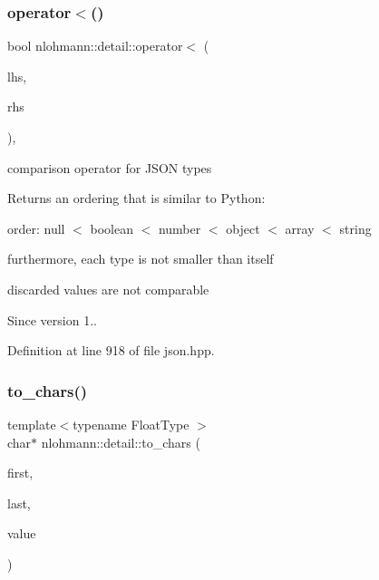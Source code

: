 \mbox{\label{namespacenlohmann_1_1detail_a09169efff3bd1771fff29bd92cea19e0}} 
\subsubsection{\texorpdfstring{operator$<$()}{operator<()}}
{\footnotesize\ttfamily bool nlohmann\+::detail\+::operator$<$ (\begin{DoxyParamCaption}\item[{const \hyperlink{namespacenlohmann_1_1detail_a1ed8fc6239da25abcaf681d30ace4985}{value\+\_\+t}}]{lhs,  }\item[{const \hyperlink{namespacenlohmann_1_1detail_a1ed8fc6239da25abcaf681d30ace4985}{value\+\_\+t}}]{rhs }\end{DoxyParamCaption})\hspace{0.3cm}{\ttfamily [inline]}, {\ttfamily [noexcept]}}



comparison operator for J\+S\+ON types 

Returns an ordering that is similar to Python\+:
\begin{DoxyItemize}
\item order\+: null $<$ boolean $<$ number $<$ object $<$ array $<$ string
\item furthermore, each type is not smaller than itself
\item discarded values are not comparable
\end{DoxyItemize}

\begin{DoxySince}{Since}
version 1.. 
\end{DoxySince}


Definition at line 918 of file json.\+hpp.

\mbox{\label{namespacenlohmann_1_1detail_a6192f1eab05fbbc5c35edb8368c8fc57}} 
\subsubsection{\texorpdfstring{to\+\_\+chars()}{to\_chars()}}
{\footnotesize\ttfamily template$<$typename Float\+Type $>$ \\
char$\ast$ nlohmann\+::detail\+::to\+\_\+chars (\begin{DoxyParamCaption}\item[{char $\ast$}]{first,  }\item[{char $\ast$}]{last,  }\item[{Float\+Type}]{value }\end{DoxyParamCaption})}



